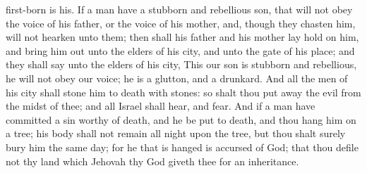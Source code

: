 first-born is his.  If a man have a stubborn and rebellious son, that will not obey the voice of his father, or the voice of his mother, and, though they chasten him, will not hearken unto them; then shall his father and his mother lay hold on him, and bring him out unto the elders of his city, and unto the gate of his place; and they shall say unto the elders of his city, This our son is stubborn and rebellious, he will not obey our voice; he is a glutton, and a drunkard. And all the men of his city shall stone him to death with stones: so shalt thou put away the evil from the midst of thee; and all Israel shall hear, and fear.  And if a man have committed a sin worthy of death, and he be put to death, and thou hang him on a tree; his body shall not remain all night upon the tree, but thou shalt surely bury him the same day; for he that is hanged is accursed of God; that thou defile not thy land which Jehovah thy God giveth thee for an inheritance. 

